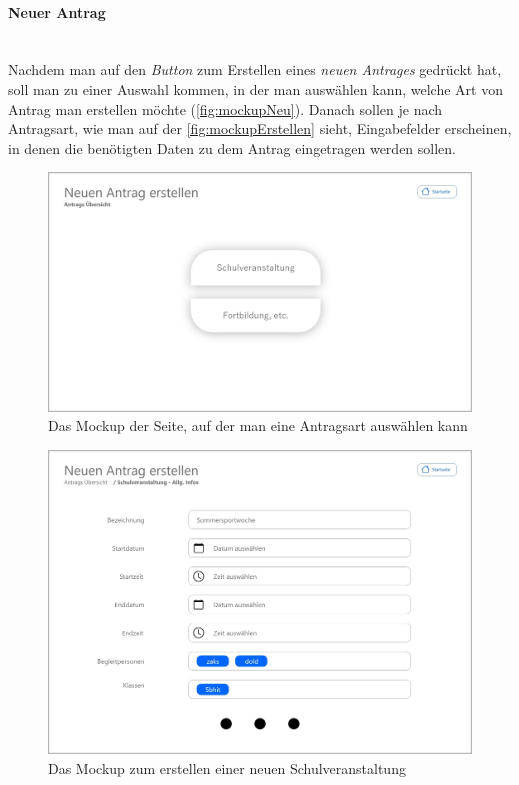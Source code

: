 \paragraph{Neuer Antrag}
~\\
Nachdem man auf den \textit{Button} zum Erstellen eines \textit{neuen Antrages} gedrückt hat, soll man zu einer Auswahl kommen, in der man auswählen kann, welche Art von Antrag man erstellen möchte (\autoref{fig:mockupNeu}). Danach sollen je nach Antragsart, wie man auf der \autoref{fig:mockupErstellen} sieht, Eingabefelder erscheinen, in denen die benötigten Daten zu dem Antrag eingetragen werden sollen.
\begin{figure}[H]
	\centering
	\includegraphics[width=1\linewidth]{images/ldehner_konzept/Mockup-Neuer-Antrag}
	\caption[Mockup neuer Antrag]{Das Mockup der Seite, auf der man eine Antragsart auswählen kann}
	\label{fig:mockupNeu}
\end{figure}
\begin{figure}[H]
	\centering
	\includegraphics[width=1\linewidth]{images/ldehner_konzept/Mockup-Antrag-erstellen}
	\caption[Mockup Antrag erstellen]{Das Mockup zum erstellen einer neuen Schulveranstaltung}
	\label{fig:mockupErstellen}
\end{figure}
